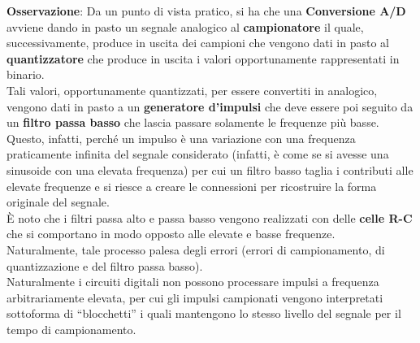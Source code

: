 \documentclass[a4paper]{extarticle}
\newcommand{\quotes}[1]{``#1''}
\begin{document}
\vspace{1em}
\noindent
\textbf{Osservazione}: Da un punto di vista pratico, si ha che una \textbf{Conversione A/D} avviene dando in pasto un segnale analogico al \textbf{campionatore} il quale, successivamente, produce in uscita dei campioni che vengono dati in pasto al \textbf{quantizzatore} che produce in uscita i valori opportunamente rappresentati in binario.\\
Tali valori, opportunamente quantizzati, per essere convertiti in analogico, vengono dati in pasto a un \textbf{generatore d'impulsi} che deve essere poi seguito da un \textbf{filtro passa basso} che lascia passare solamente le frequenze più basse. Questo, infatti, perché un impulso è una variazione con una frequenza praticamente infinita del segnale considerato (infatti, è come se si avesse una sinusoide con una elevata frequenza) per cui un filtro basso taglia i contributi alle elevate frequenze e si riesce a creare le connessioni per ricostruire la forma originale del segnale.\\
È noto che i filtri passa alto e passa basso vengono realizzati con delle \textbf{celle R-C} che si comportano in modo opposto alle elevate e basse frequenze.\\
Naturalmente, tale processo palesa degli errori (errori di campionamento, di quantizzazione e del filtro passa basso).\\
Naturalmente i circuiti digitali non possono processare impulsi a frequenza arbitrariamente elevata, per cui gli impulsi campionati vengono interpretati sottoforma di \quotes{blocchetti} i quali mantengono lo stesso livello del segnale per il tempo di campionamento.

\vspace{1em}
\end{document}
